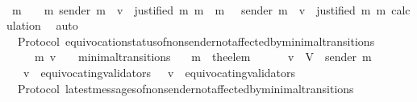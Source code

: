 \begin{isabellebody}
\ \ \ \ \isamarkupfalse%
\ {\isacartoucheopen}{\isacharbraceleft}m{\isacharprime}{\isacharprime}\ {\isasymin}\ {\isasymsigma}\ {\isasymunion}\ {\isacharbraceleft}m{\isacharprime}{\isacharbraceright}{\isachardot}\ sender\ m{\isacharprime}{\isacharprime}\ {\isacharequal}\ v\ {\isasymand}\ justified\ m\ m{\isacharprime}{\isacharprime}{\isacharbraceright}\ {\isacharequal}\ {\isacharbraceleft}m{\isacharprime}{\isacharprime}\ {\isasymin}\ {\isasymsigma}{\isacharprime}{\isachardot}\ sender\ m{\isacharprime}{\isacharprime}\ {\isacharequal}\ v\ {\isasymand}\ justified\ m\ m{\isacharprime}{\isacharprime}{\isacharbraceright}{\isacartoucheclose}\ calculation\ \isamarkupfalse%
\ auto\isanewline
{}\isamarkupfalse%
%
\endisatagproof
{\isafoldproof}%
%
\isadelimproof
\isanewline
%
\endisadelimproof
\isanewline
\isanewline
{}\isamarkupfalse%
\ {\isacharparenleft}\ Protocol{\isacharparenright}\ equivocation{\isacharunderscore}status{\isacharunderscore}of{\isacharunderscore}non{\isacharunderscore}sender{\isacharunderscore}not{\isacharunderscore}affected{\isacharunderscore}by{\isacharunderscore}minimal{\isacharunderscore}transitions\ {\isacharcolon}\isanewline
\ \ {\isachardoublequoteopen}{\isasymforall}\ {\isasymsigma}\ {\isasymsigma}{\isacharprime}\ m{\isacharprime}\ v{\isachardot}\ {\isacharparenleft}{\isasymsigma}{\isacharcomma}\ {\isasymsigma}{\isacharprime}{\isacharparenright}\ {\isasymin}\ minimal{\isacharunderscore}transitions\isanewline
\ \ {\isasymlongrightarrow}\ m{\isacharprime}\ {\isacharequal}\ the{\isacharunderscore}elem\ {\isacharparenleft}{\isasymsigma}{\isacharprime}\ {\isacharminus}\ {\isasymsigma}{\isacharparenright}\isanewline
\ \ {\isasymlongrightarrow}\ v\ {\isasymin}\ V\ {\isacharminus}\ {\isacharbraceleft}sender\ m{\isacharprime}{\isacharbraceright}\isanewline
\ \ {\isasymlongrightarrow}\ v\ {\isasymin}\ equivocating{\isacharunderscore}validators\ {\isasymsigma}\ {\isasymlongleftrightarrow}\ v\ {\isasymin}\ equivocating{\isacharunderscore}validators\ {\isasymsigma}{\isacharprime}{\isachardoublequoteclose}\isanewline
%
\isadelimproof
\ \ %
\endisadelimproof
%
\isatagproof
{}\isamarkupfalse%
%
\endisatagproof
{\isafoldproof}%
%
\isadelimproof
\isanewline
%
\endisadelimproof
\isanewline
\isanewline
{}\isamarkupfalse%
\ {\isacharparenleft}\ Protocol{\isacharparenright}\ latest{\isacharunderscore}messages{\isacharunderscore}of{\isacharunderscore}non{\isacharunderscore}sender{\isacharunderscore}not{\isacharunderscore}affected{\isacharunderscore}by{\isacharunderscore}minimal{\isacharunderscore}transitions\ {\isacharcolon}\isanewline

\end{isabellebody}
